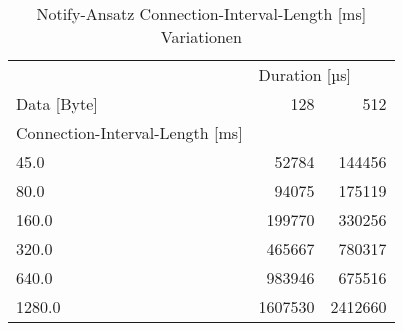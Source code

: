 \begin{table}
\centering
\caption{Notify-Ansatz Connection-Interval-Length [ms] Variationen}
\label{table:notifydetailconnectionintervalchange}
\begin{tabular}{lrr}
\toprule
{} & \multicolumn{2}{l}{Duration [µs]} \\
Data [Byte] &      128 &      512 \\
Connection-Interval-Length [ms] &          &          \\
\midrule
45.0                &    52784 &   144456 \\
80.0                &    94075 &   175119 \\
160.0               &   199770 &   330256 \\
320.0               &   465667 &   780317 \\
640.0               &   983946 &   675516 \\
1280.0              &  1607530 &  2412660 \\
\bottomrule
\end{tabular}
\end{table}
